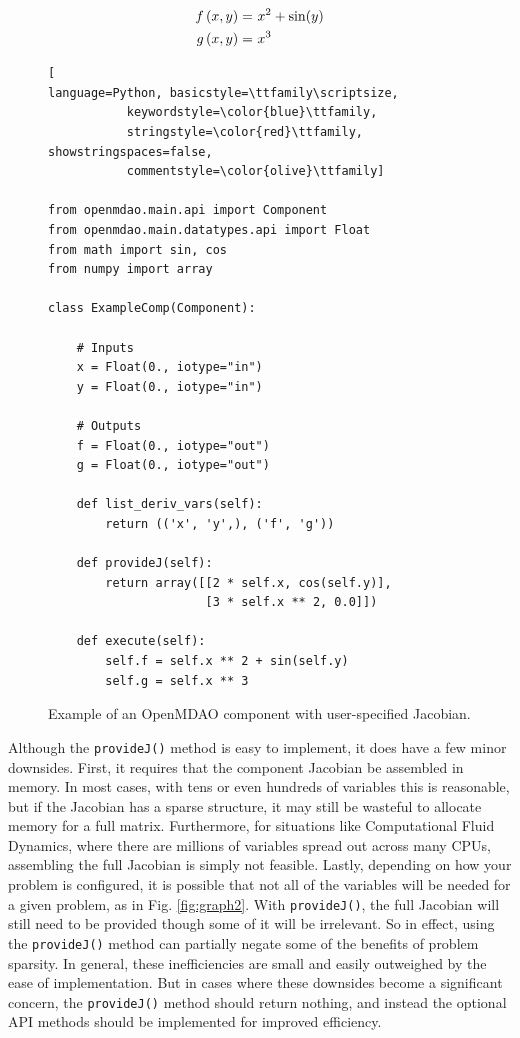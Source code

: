 \documentclass[]{aiaa-tc} %
\begin{document}
        \begin{align}
            f\left(x, y\right) =&\  x^2 + \sin(y) \\ \notag
            g\left(x, y\right) =&\  x^3
        \end{align}

\begin{figure}
\begin{minipage}{\textwidth}
\begin{lstlisting}[
language=Python, basicstyle=\ttfamily\scriptsize,
           keywordstyle=\color{blue}\ttfamily,
           stringstyle=\color{red}\ttfamily, showstringspaces=false,
           commentstyle=\color{olive}\ttfamily]

from openmdao.main.api import Component
from openmdao.main.datatypes.api import Float
from math import sin, cos
from numpy import array

class ExampleComp(Component):

    # Inputs
    x = Float(0., iotype="in")
    y = Float(0., iotype="in")

    # Outputs
    f = Float(0., iotype="out")
    g = Float(0., iotype="out")

    def list_deriv_vars(self):
        return (('x', 'y',), ('f', 'g'))

    def provideJ(self):
        return array([[2 * self.x, cos(self.y)],
                      [3 * self.x ** 2, 0.0]])

    def execute(self):
        self.f = self.x ** 2 + sin(self.y)
        self.g = self.x ** 3

\end{lstlisting}
\caption{Example of an OpenMDAO
component with user-specified Jacobian.
\label{fig:code-block-1}}
\end{minipage}

\end{figure}

        Although the \texttt{provideJ()} method is easy to implement, it does have a few minor downsides. First,
        it requires that the component Jacobian be assembled in memory. In most cases, with tens or even hundreds of variables
        this is reasonable, but if the Jacobian has a sparse structure, it may still be wasteful to allocate memory for a
        full matrix. Furthermore, for situations like Computational Fluid Dynamics, where there are millions of variables spread out
        across many CPUs, assembling the full Jacobian is simply not feasible. Lastly, depending on how
        your problem is configured, it is possible that not all of the variables will be needed for a given problem, as in Fig. \ref{fig:graph2}. 
        With \texttt{provideJ()}, the full Jacobian will still need to be provided though some of it will be irrelevant.
        So in effect, using the \texttt{provideJ()} method can partially negate some of the benefits of problem sparsity. 
        In general, these inefficiencies are small and easily outweighed by the ease of implementation. But in cases where 
        these downsides become a significant concern, the \texttt{provideJ()} method should return nothing, and instead the
        optional API methods should be implemented for improved efficiency.
\end{document}
